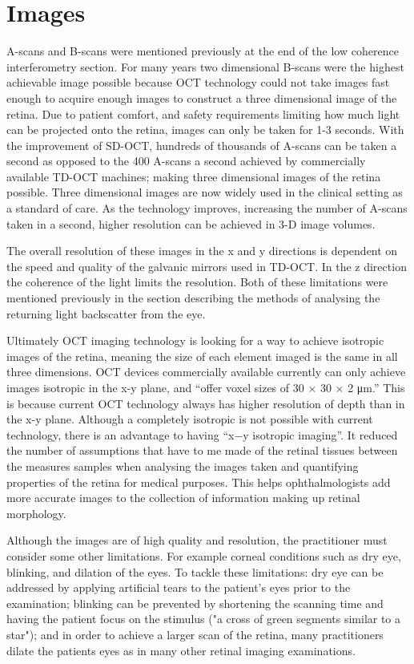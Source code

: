 \section{Images}
A-scans and B-scans were mentioned previously at the end of the low coherence interferometry
section.  For many years two dimensional B-scans were the highest achievable image possible
because OCT technology could not take images fast enough to acquire enough images to
construct a three dimensional image of the retina.  Due to patient comfort, and safety
requirements limiting how much light can be projected onto the retina, images can only be
taken for 1-3 seconds. \cite{mbib_4} With the improvement of SD-OCT, hundreds of thousands
of A-scans can be taken a second as opposed to the 400 A-scans a second achieved by
commercially available TD-OCT machines; making three dimensional images of the retina
possible.\cite{mbib_4}  Three dimensional images are now widely used in the clinical
setting as a standard of care.  As the technology improves, increasing the number of
A-scans taken in a second, higher resolution can be achieved in 3-D image volumes.\cite{mbib_4}

The overall resolution of these images in the x and y directions is dependent on the
speed and quality of the galvanic mirrors used in TD-OCT.  In the z direction the
coherence of the light limits the resolution.  Both of these limitations were mentioned
previously in the section describing the methods of analysing the returning light
backscatter from the eye.

Ultimately OCT imaging technology is looking for a way to achieve isotropic images
of the retina, meaning the size of each element imaged is the same in all three
dimensions.  OCT devices commercially available currently can only achieve images
isotropic in the x-y plane, and “offer voxel sizes of 30 × 30 × 2 μm.” \cite{mbib_4}
This is because current OCT technology always has higher resolution of depth than
in the x-y plane. \cite{mbib_4}  Although a completely isotropic is not possible
with current technology, there is an advantage to having “x−y isotropic imaging”.\cite{mbib_4}
It reduced the number of assumptions that have to me made of the retinal tissues
between the measures samples when analysing the images taken and quantifying
properties of the retina for medical purposes. \cite{mbib_4} This helps
ophthalmologists add more accurate images to the collection of information
making up retinal morphology.

Although the images are of high quality and resolution, the practitioner must consider
some other limitations.  For example corneal conditions such as dry eye, blinking, and
dilation of the eyes.  To tackle these limitations: dry eye can be addressed by applying
artificial tears to the patient’s eyes prior to the examination; blinking can be prevented
by shortening the scanning time and having the patient focus on the stimulus ("a cross of
green segments similar to a star"); and in order to achieve a larger scan of the retina,
many practitioners dilate the patients eyes as in many other retinal imaging examinations.\cite{mbib_4}

